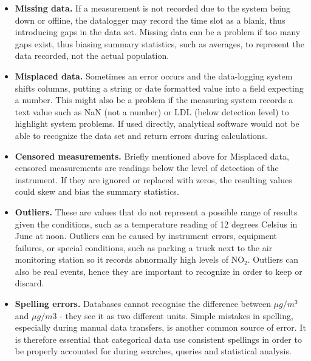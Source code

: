 \begin{itemize}
\item \textbf{Missing data.} If a measurement is not recorded due to the system being down or offline, the datalogger may record the time slot as a blank, thus introducing gaps in the data set. Missing data can be a problem if too many gaps exist, thus biasing summary statistics, such as averages, to represent the data recorded, not the actual population.
\item \textbf{Misplaced data.} Sometimes an error occurs and the data-logging system shifts columns, putting a string or date formatted value into a field expecting a number. This might also be a problem if the measuring system records a text value such as NaN (not a number) or LDL (below detection level) to highlight system problems. If used directly, analytical software would not be able to recognize the data set and return errors during calculations.
\item \textbf{Censored measurements.} Briefly mentioned above for Misplaced data, censored measurements are readings below the level of detection of the instrument. If they are ignored or replaced with zeros, the resulting values could skew and bias the summary statistics.
\item \textbf{Outliers.} These are values that do not represent a possible range of results given the conditions, such as a temperature reading of 12 degrees Celsius in June at noon. Outliers can be caused by instrument errors, equipment failures, or special conditions, such as parking a truck next to the air monitoring station so it records abnormally high levels of NO$_{2}$. Outliers can also be real events, hence they are important to recognize in order to keep or discard.
\item \textbf{Spelling errors.} Databases cannot recognise the difference between $\mu g/m^{3}$ and  $\mu g/m3$ - they see it as two different units. Simple mistakes in spelling, especially during manual data transfers, is another common source of error.  It is therefore essential that categorical data use consistent spellings in order to be properly accounted for during searches, queries and statistical analysis.

\end{itemize}

